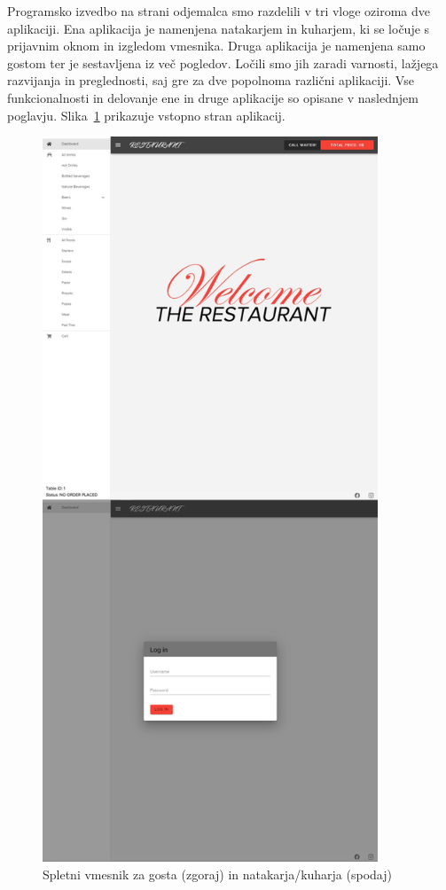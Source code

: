 \documentclass[a4paper, 12pt]{book}
\begin{document}
Programsko izvedbo na strani odjemalca smo razdelili v tri vloge oziroma dve aplikaciji. Ena aplikacija je namenjena natakarjem in kuharjem, ki se ločuje s prijavnim oknom in izgledom vmesnika. Druga aplikacija je namenjena samo gostom ter je sestavljena iz več pogledov. Ločili smo jih zaradi varnosti, lažjega razvijanja in preglednosti, saj gre za dve popolnoma različni aplikaciji. Vse funkcionalnosti in delovanje ene in druge aplikacije so opisane v naslednjem poglavju. Slika~\ref{Gost} prikazuje vstopno stran aplikacij.

\begin{figure}
\begin{center}
\includegraphics[width=10cm]{Gost_natakar.png}
\caption{Spletni vmesnik za gosta (zgoraj) in natakarja/kuharja (spodaj)}
\label{Gost}
\end{center}
\end{figure}
\end{document}
